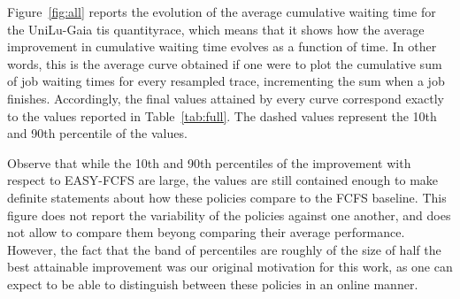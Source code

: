 \documentclass[sigconf,review,anonymous]{acmart}
\begin{document}
Figure~\ref{fig:all} reports the evolution of the average cumulative waiting
time for the UniLu-Gaia tis quantityrace, which means that it shows how the
average improvement in cumulative waiting time evolves as a function of time.
In other words, this is the average curve obtained if one were to plot the
cumulative sum of job waiting times for every resampled trace, incrementing the
sum when a job finishes. Accordingly, the final values attained by every curve
correspond exactly to the values reported in Table~\ref{tab:full}. The dashed
values represent the 10th and 90th percentile of the values.

Observe that while the 10th and 90th percentiles of the improvement with
respect to EASY-FCFS are large, the values are still contained enough to make
definite statements about how these policies compare to the FCFS baseline.
This figure does not report the variability of the policies against one another,
and does not allow to compare them beyong comparing their average performance.
However, the fact that the band of percentiles are roughly of the size of half
the best attainable improvement was our original motivation for this work, as
one can expect to be able to distinguish between these policies in an
online manner.
\end{document}
